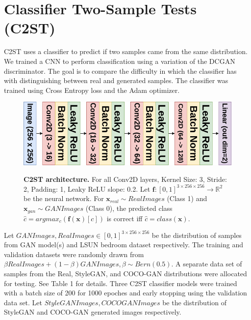 \documentclass{article}
\begin{document}
        \section{Classifier Two-Sample Tests (C2ST)}
        \label{subsec:c2st}
        C2ST uses a classifier to predict if two samples came from the same distribution\cite{c2st}.
        We trained a CNN to perform classification using a variation of the DCGAN discriminator\cite{dcgan}.
        The goal is to compare the difficulty in which the classifier has with distinguishing between real and generated samples.
        The classifier was trained using Cross Entropy loss and the Adam optimizer.
        \begin{figure}[!htb]
          \centering
          \includegraphics[scale=0.26]{c2st-diagram.png}\\
          \caption{ \textbf{C2ST architecture.} For all Conv2D layers, Kernel Size: 3, Stride: 2, Padding: 1, Leaky ReLU slope: 0.2. Let $\mathbf{f}: [0, 1]^{3 \times 256 \times 256} \rightarrow \mathbb{R}^{2}$ be the neural network. For $\mathbf{x}_{real} \sim RealImages$ (Class 1) and $\mathbf{x}_{gan} \sim GANImages$ (Class 0), the predicted class $\hat{c} =argmax_c (\mathbf{f}(\mathbf{x})[c])$ is correct iff $\hat{c} = class(\mathbf{x})$.}
        \end{figure}
        Let $GANImages, RealImages \in [0, 1]^{3 \times 256 \times 256}$ be the distribution of samples from GAN model(s) and LSUN bedroom dataset respectively.
        The training and validation datasets were randomly drawn from $\beta RealImages + (1 - \beta)GANImages, \beta \sim Bern(0.5)$. 
        A separate data set of samples from the Real, StyleGAN, and COCO-GAN distributions were allocated for testing.
        See Table 1 for details.
        Three C2ST classifier models were trained with a batch size of 200 for 1000 epoches and early stopping using the validation data set.
        Let $StyleGANImages, COCOGANImages$ be the distribution of StyleGAN and COCO-GAN generated images respectively. 
        
\end{document}
